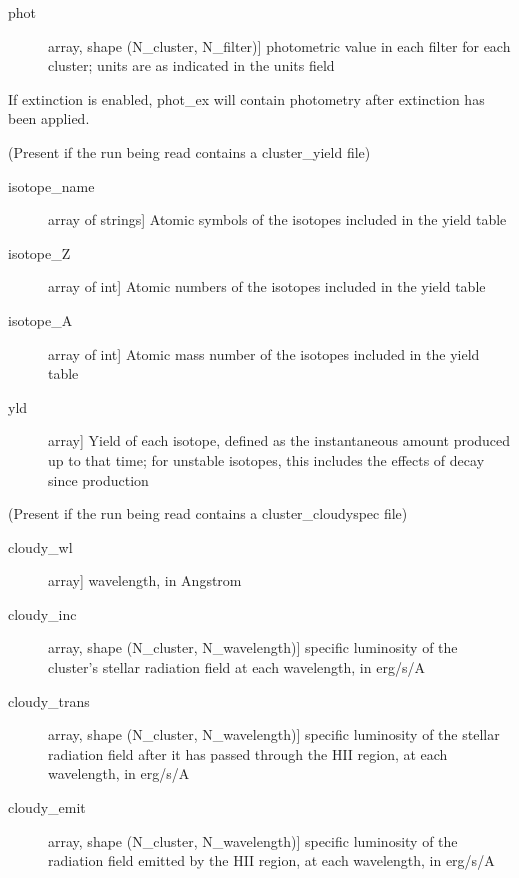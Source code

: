 \documentclass[letterpaper,10pt,english]{sphinxmanual}
\begin{document}
\begin{fulllineitems}
\begin{description}
\begin{description}
\item[{phot}] \leavevmode{[}array, shape (N\_cluster, N\_filter){]}
photometric value in each filter for each cluster; units are as
indicated in the units field

\end{description}

If extinction is enabled, phot\_ex will contain photometry  
after extinction has been applied.

(Present if the run being read contains a cluster\_yield file)
\begin{description}
\item[{isotope\_name}] \leavevmode{[}array of strings{]}
Atomic symbols of the isotopes included in the yield table

\item[{isotope\_Z}] \leavevmode{[}array of int{]}
Atomic numbers of the isotopes included in the yield table

\item[{isotope\_A}] \leavevmode{[}array of int{]}
Atomic mass number of the isotopes included in the yield table

\item[{yld}] \leavevmode{[}array{]}
Yield of each isotope, defined as the instantaneous amount
produced up to that time; for unstable isotopes, this
includes the effects of decay since production

\end{description}

(Present if the run being read contains a cluster\_cloudyspec file)
\begin{description}
\item[{cloudy\_wl}] \leavevmode{[}array{]}
wavelength, in Angstrom

\item[{cloudy\_inc}] \leavevmode{[}array, shape (N\_cluster, N\_wavelength){]}
specific luminosity of the cluster's stellar radiation field at
each wavelength, in erg/s/A

\item[{cloudy\_trans}] \leavevmode{[}array, shape (N\_cluster, N\_wavelength){]}
specific luminosity of the stellar radiation field after it has
passed through the HII region, at each wavelength, in erg/s/A

\item[{cloudy\_emit}] \leavevmode{[}array, shape (N\_cluster, N\_wavelength){]}
specific luminosity of the radiation field emitted by the HII
region, at each wavelength, in erg/s/A


\end{description}
\end{description}
\end{fulllineitems}
\end{document}
